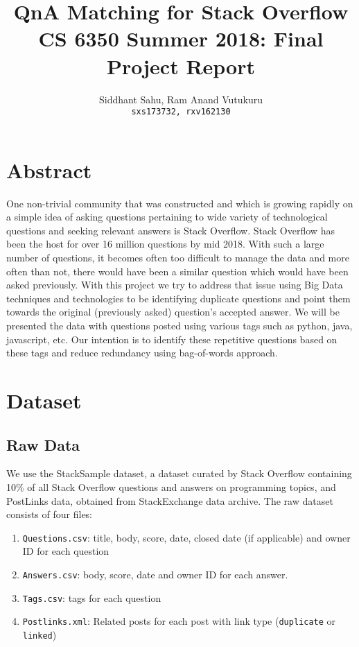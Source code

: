 \documentclass{article}
\title{QnA Matching for Stack Overflow\\
	\large CS 6350 Summer 2018: Final Project Report}
\author{Siddhant Sahu, Ram Anand Vutukuru\\
	\texttt{sxs173732, rxv162130}}
\begin{document}
\maketitle

\section{Abstract}
One non-trivial community that was constructed and which is growing rapidly on a simple idea of asking questions pertaining to wide variety of technological questions and seeking relevant answers is Stack Overflow. Stack Overflow has been the host for over 16 million questions by mid 2018. With such a large number of questions, it becomes often too difficult to manage the data and more often than not, there would have been a similar question which would have been asked previously. With this project we try to address that issue using Big Data techniques and technologies to be identifying duplicate questions and point them towards the original (previously asked) question’s accepted answer. We will be presented the data with questions posted using various tags such as python, java, javascript, etc. Our intention is to identify these repetitive questions based on these tags and reduce redundancy using bag-of-words approach.

\section{Dataset}
\subsection{Raw Data}
We use the StackSample\cite{dataset} dataset, a dataset curated by Stack Overflow containing 10\% of all Stack Overflow questions and answers on programming topics, and PostLinks data, obtained from StackExchange data archive. The raw dataset consists of four files:
\begin{enumerate}
	\item \texttt{Questions.csv}: title, body, score, date, closed date (if applicable) and owner ID for each question
	\item \texttt{Answers.csv}: body, score, date and owner ID for each answer.
	\item \texttt{Tags.csv}: tags for each question
	\item \texttt{Postlinks.xml}: Related posts for each post with link type (\texttt{duplicate} or \texttt{linked})
\end{enumerate}
\end{document}
